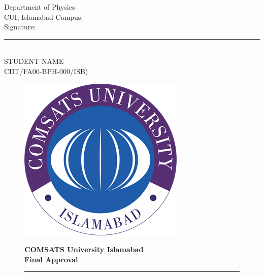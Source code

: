 \documentclass[12pt,two side]{report}
\begin{document}
\begin{titlepage}
\begin{flushleft}
Department of Physics \\
CUI, Islamabad Campus. \vspace{0.8cm}\\
\hfill Signature: \noindent\rule{4cm}{0.02cm}\\ 
\hfill STUDENT NAME \:\:\;\; \qquad\qquad\qquad\qquad \\
\hfill CIIT/FA00-BPH-000/ISB)\vspace{0.8cm}
\end{flushleft} 
\newpage
\noindent
\begin{figure}                                             %
\begin{minipage}{0.1\linewidth}                            %
\flushright                                                %
\includegraphics[scale=0.3]{comsatslogo.png}               %
\end{minipage}                                             %
\begin{minipage}[c]{\linewidth}                            %
 \centering                                                %
 \Large{ \textbf{COMSATS University Islamabad}}\\          %
\textbf{Final Approval} \\\rule{13cm}{1pt}                 %
\end{minipage}                                             %
\end{figure}                                               %

\end{titlepage}
\end{document}
